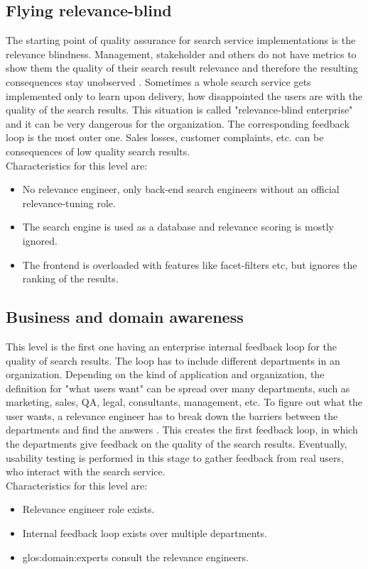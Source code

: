 \subsection{Flying relevance-blind}
\label{ref:qa:orga:blind}
The starting point of quality assurance for search service implementations is the relevance blindness.
Management, stakeholder and others do not have metrics to show them the quality of their search result relevance 
and therefore the resulting consequences stay unobserved \cite[see][P. 263]{relevant_search_2016}. 
Sometimes a whole search service gets implemented only to learn upon delivery, how disappointed the users are with the quality of the search results.
This situation is called "relevance-blind enterprise" and it can be very dangerous for the organization.
The corresponding feedback loop is the most outer one. Sales losses, customer complaints, etc. can be consequences of low quality search results.\\
Characteristics for this level are:
\begin{itemize}
	\item No relevance engineer, only back-end search engineers without an official relevance-tuning role.
	\item The search engine is used as a database and relevance scoring is mostly ignored.
	\item The frontend is overloaded with features like facet-filters etc, but ignores the ranking of the results.
\end{itemize}

\subsection{Business and domain awareness}
\label{ref:qa:orga:awarness}
This level is the first one having an enterprise internal feedback loop for the quality of search results.
The loop has to include different departments in an organization. Depending on the kind of application and organization,
the definition for "what users want" can be spread over many departments, such as marketing, sales, QA, legal,
consultants, management, etc. To figure out what the user wants, 
a relevance engineer has to break down the barriers between the departments and find the answers \cite[see][P. 265]{relevant_search_2016}.
This creates the first feedback loop, in which the departments give feedback on the quality of the search results.
Eventually, usability testing is performed in this stage to gather feedback from real users, who interact with the search service.\\
Characteristics for this level are:
\begin{itemize}
	\item Relevance engineer role exists.
	\item Internal feedback loop exists over multiple departments.
	\item \glspl{glos:domain:expert} consult the relevance engineers.
\end{itemize}

